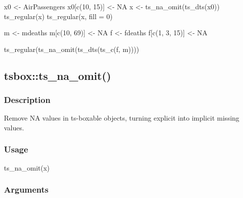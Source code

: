 \documentclass[
  letterpaper,
  DIV=11,
  numbers=noendperiod]{scrreport}
\newenvironment{Shaded}{\begin{snugshade}}{\end{snugshade}}
\newcommand{\AttributeTok}[1]{\textcolor[rgb]{0.40,0.45,0.13}{#1}}
\newcommand{\ConstantTok}[1]{\textcolor[rgb]{0.56,0.35,0.01}{#1}}
\newcommand{\DecValTok}[1]{\textcolor[rgb]{0.68,0.00,0.00}{#1}}
\newcommand{\FunctionTok}[1]{\textcolor[rgb]{0.28,0.35,0.67}{#1}}
\newcommand{\NormalTok}[1]{\textcolor[rgb]{0.00,0.23,0.31}{#1}}
\newcommand{\OtherTok}[1]{\textcolor[rgb]{0.00,0.23,0.31}{#1}}
\begin{document}
\begin{Shaded}
\begin{Highlighting}[]
\NormalTok{x0 }\OtherTok{\textless{}{-}}\NormalTok{ AirPassengers}
\NormalTok{x0[}\FunctionTok{c}\NormalTok{(}\DecValTok{10}\NormalTok{, }\DecValTok{15}\NormalTok{)] }\OtherTok{\textless{}{-}} \ConstantTok{NA}
\NormalTok{x }\OtherTok{\textless{}{-}} \FunctionTok{ts\_na\_omit}\NormalTok{(}\FunctionTok{ts\_dts}\NormalTok{(x0))}
\FunctionTok{ts\_regular}\NormalTok{(x)}
\FunctionTok{ts\_regular}\NormalTok{(x, }\AttributeTok{fill =} \DecValTok{0}\NormalTok{)}

\NormalTok{m }\OtherTok{\textless{}{-}}\NormalTok{ mdeaths}
\NormalTok{m[}\FunctionTok{c}\NormalTok{(}\DecValTok{10}\NormalTok{, }\DecValTok{69}\NormalTok{)] }\OtherTok{\textless{}{-}} \ConstantTok{NA}
\NormalTok{f }\OtherTok{\textless{}{-}}\NormalTok{ fdeaths}
\NormalTok{f[}\FunctionTok{c}\NormalTok{(}\DecValTok{1}\NormalTok{, }\DecValTok{3}\NormalTok{, }\DecValTok{15}\NormalTok{)] }\OtherTok{\textless{}{-}} \ConstantTok{NA}

\FunctionTok{ts\_regular}\NormalTok{(}\FunctionTok{ts\_na\_omit}\NormalTok{(}\FunctionTok{ts\_dts}\NormalTok{(}\FunctionTok{ts\_c}\NormalTok{(f, m))))}
\end{Highlighting}
\end{Shaded}

\subsection{tsbox::ts\_na\_omit()}\label{tsboxts_na_omit}

\subsubsection{Description}\label{description-11}

Remove NA values in ts-boxable objects, turning explicit into implicit
missing values.

\subsubsection{Usage}\label{usage-11}

\begin{Shaded}
\begin{Highlighting}[]
\FunctionTok{ts\_na\_omit}\NormalTok{(x)}
\end{Highlighting}
\end{Shaded}

\subsubsection{Arguments}\label{arguments-11}
\end{document}
